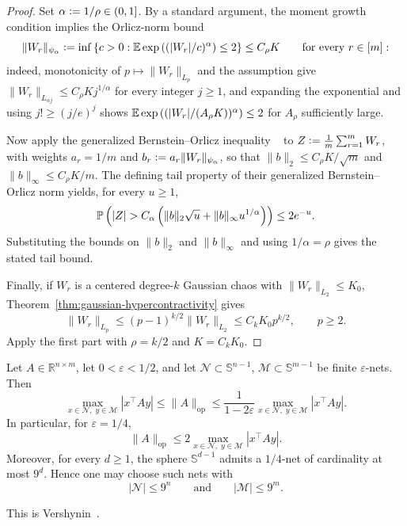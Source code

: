 \begin{proof}
Set \(\alpha\vcentcolon=1/\rho\in(0,1]\). By a standard argument, the moment growth
condition implies the Orlicz-norm bound
\[
\|W_r\|_{\psi_\alpha}
\vcentcolon=
\inf\left\{c>0:\mathbb{E}\exp\left((|W_r|/c)^\alpha\right)\le2\right\}
\le
C_\rho K
\qquad\text{for every }r\in[m]:
\]
indeed, monotonicity of \(p\mapsto\|W_r\|_{L_p}\) and the assumption give
\(\|W_r\|_{L_{\alpha j}}\le C_\rho Kj^{1/\alpha}\) for every integer \(j\ge1\),
and expanding the exponential and using \(j!\ge(j/e)^j\) shows
\(\mathbb{E}\exp\left((|W_r|/(A_\rho K))^\alpha\right)\le2\) for \(A_\rho\) sufficiently
large.

Now apply the generalized Bernstein--Orlicz inequality ~\cite[Theorem~3.1]{kuchibhotla2022moving} to
\(Z\vcentcolon=\frac1m\sum_{r=1}^mW_r\), with weights \(a_r=1/m\) and
\(b_r\vcentcolon= a_r\|W_r\|_{\psi_\alpha}\), so that
\(\|b\|_2\le C_\rho K/\sqrt m\) and \(\|b\|_\infty\le C_\rho K/m\).
The defining tail property of their generalized Bernstein--Orlicz norm yields,
for every \(u\ge1\),
\[
\mathbb{P}\left(
|Z|
>
C_\alpha\left(
\|b\|_2\sqrt u
+
\|b\|_\infty u^{1/\alpha}
\right)
\right)
\le
2e^{-u}.
\]
Substituting the bounds on \(\|b\|_2\) and \(\|b\|_\infty\) and using
\(1/\alpha=\rho\) gives the stated tail bound.

Finally, if \(W_r\) is a centered degree-\(k\) Gaussian chaos with
\(\|W_r\|_{L_2}\le K_0\), Theorem~\ref{thm:gaussian-hypercontractivity} gives
\[
\|W_r\|_{L_p}
\le
(p-1)^{k/2}\|W_r\|_{L_2}
\le
C_kK_0p^{k/2},
\qquad p\ge2.
\]
Apply the first part with \(\rho=k/2\) and \(K=C_kK_0\).
\end{proof}
\begin{theorem}
\label{thm:operator-norm-net}
Let \(A\in\mathbb R^{n\times m}\), let \(0<\varepsilon<1/2\), and let
\(\mathcal N\subset \mathbb S^{n-1}\), \(\mathcal M\subset\mathbb S^{m-1}\)
be finite \(\varepsilon\)-nets. Then
\[
\max_{x\in\mathcal N,\;y\in\mathcal M}|x^\top Ay|
\le
\|A\|_{\mathrm{op}}
\le
\frac{1}{1-2\varepsilon}
\max_{x\in\mathcal N,\;y\in\mathcal M}|x^\top Ay|.
\]
In particular, for \(\varepsilon=1/4\),
\[
\|A\|_{\mathrm{op}}
\le
2\max_{x\in\mathcal N,\;y\in\mathcal M}|x^\top Ay|.
\]
Moreover, for every \(d\ge 1\), the sphere \(\mathbb S^{d-1}\) admits a
\(1/4\)-net of cardinality at most \(9^d\). Hence one may choose such nets with
\[
|\mathcal N|\le 9^n
\qquad\text{and}\qquad
|\mathcal M|\le 9^m .
\]
\end{theorem}

\noindent
This is Vershynin~\cite[Lemma~4.4.2 and Corollary~4.2.11]{vershynin2026high}.

